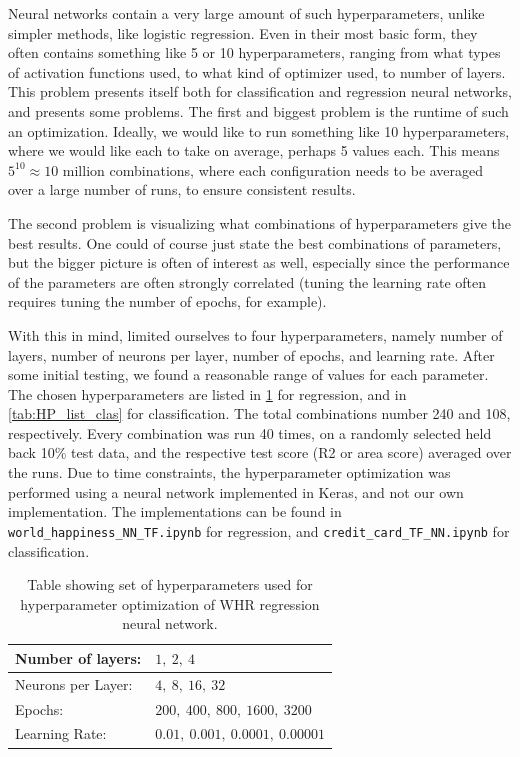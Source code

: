 \documentclass[10pt, twocolumn]{article}
\begin{document}
Neural networks contain a very large amount of such hyperparameters, unlike simpler methods, like logistic regression. Even in their most basic form, they often contains something like 5 or 10 hyperparameters, ranging from what types of activation functions used, to what kind of optimizer used, to number of layers. This problem presents itself both for classification and regression neural networks, and presents some problems. The first and biggest problem is the runtime of such an optimization. Ideally, we would like to run something like 10 hyperparameters, where we would like each to take on average, perhaps 5 values each. This means $5^{10} \approx 10\text{ million}$ combinations, where each configuration needs to be averaged over a large number of runs, to ensure consistent results.

The second problem is visualizing what combinations of hyperparameters give the best results. One could of course just state the best combinations of parameters, but the bigger picture is often of interest as well, especially since the performance of the parameters are often strongly correlated (tuning the learning rate often requires tuning the number of epochs, for example).

With this in mind, limited ourselves to four hyperparameters, namely number of layers, number of neurons per layer, number of epochs, and learning rate. After some initial testing, we found a reasonable range of values for each parameter. The chosen hyperparameters are listed in \cref{tab:HP_list_reg} for regression, and in \cref{tab:HP_list_clas} for classification. The total combinations number 240 and 108, respectively. Every combination was run 40 times, on a randomly selected held back 10\% test data, and the respective test score (R2 or area score) averaged over the runs. Due to time constraints, the hyperparameter optimization was performed using a neural network implemented in Keras, and not our own implementation. The implementations can be found in \texttt{world\_happiness\_NN\_TF.ipynb} for regression, and \texttt{credit\_card\_TF\_NN.ipynb} for classification.

\begin{table}[H]
    \centering
    \begin{tabular}{l l}
        \hline
        Number of layers: & $1,\ 2,\ 4$ \\
        \hline
        Neurons per Layer: & $4,\ 8,\ 16,\ 32$ \\
        \hline
        Epochs: & $200,\ 400,\ 800,\ 1600,\ 3200$ \\
        \hline
        Learning Rate: & $0.01,\ 0.001,\ 0.0001,\ 0.00001$ \\
        \hline
    \end{tabular}
    \caption{Table showing set of hyperparameters used for hyperparameter optimization of WHR regression neural network.}
    \label{tab:HP_list_reg}
\end{table}
\end{document}

